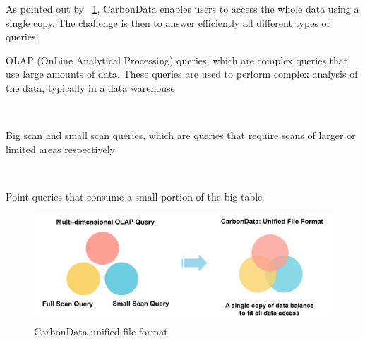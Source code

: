 \documentclass[10pt, a4paper]{report}
\begin{document}
As pointed out by \figurename~\ref{fig:carbondata_homepage}, CarbonData enables users to access the whole data using a single copy. The challenge is then to answer efficiently all different types of queries: \\

\begin{itemize}
	\begin{minipage}{0.92\textwidth}
		\item OLAP (OnLine Analytical Processing) queries, which are complex queries that use large amounts of data. These queries are used to perform complex analysis of the data, typically in a data warehouse \\
	\end{minipage} \\
	\begin{minipage}{0.92\textwidth}
		\item Big scan and small scan queries, which are queries that require scans of larger or limited areas respectively \\
	\end{minipage} \\
	\begin{minipage}{0.92\textwidth}
		\item Point queries that consume a small portion of the big table \\
	\end{minipage}
\end{itemize}

\begin{figure}
	\centering
	\includegraphics[width=12cm]{./assets/img/carbondata/carbondata.png}
	\caption{CarbonData unified file format}
	\label{fig:carbondata_homepage}
	\vspace{0.5cm}
\end{figure}
\end{document}
